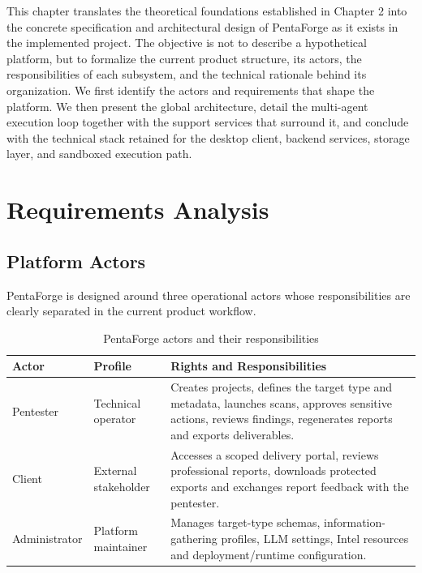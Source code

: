 \documentclass[12pt,a4paper]{report}
\begin{document}
This chapter translates the theoretical foundations established in Chapter 2 into
the concrete specification and architectural design of PentaForge as it exists in
the implemented project. The objective is not to describe a hypothetical platform,
but to formalize the current product structure, its actors, the responsibilities of
each subsystem, and the technical rationale behind its organization. We first
identify the actors and requirements that shape the platform. We then present the
global architecture, detail the multi-agent execution loop together with the support
services that surround it, and conclude with the technical stack retained for the
desktop client, backend services, storage layer, and sandboxed execution path.

\section{Requirements Analysis}

\subsection{Platform Actors}

PentaForge is designed around three operational actors whose responsibilities are
clearly separated in the current product workflow.

\begin{table}[H]
    \centering
    \caption{PentaForge actors and their responsibilities}
    \label{tab:actors}
    \renewcommand{\arraystretch}{1.35}
    \begin{tabular}{|p{}|p{}|p{}|}
        \hline
        \textbf{Actor} & \textbf{Profile} & \textbf{Rights and Responsibilities} \\
        \hline
        Pentester & Technical operator & Creates projects, defines the target type and metadata, launches scans, approves sensitive actions, reviews findings, regenerates reports and exports deliverables. \\
        \hline
        Client & External stakeholder & Accesses a scoped delivery portal, reviews professional reports, downloads protected exports and exchanges report feedback with the pentester. \\
        \hline
        Administrator & Platform maintainer & Manages target-type schemas, information-gathering profiles, LLM settings, Intel resources and deployment/runtime configuration. \\
        \hline
    \end{tabular}
\end{table}
\end{document}
